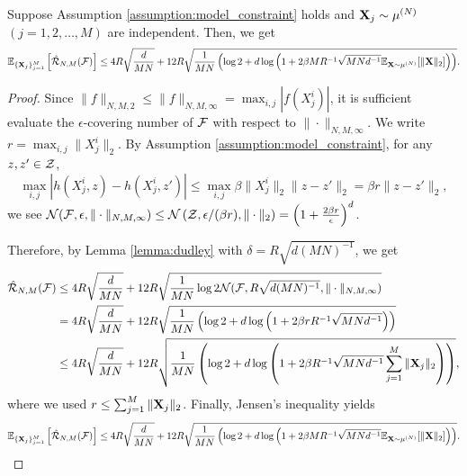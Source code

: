 \begin{proposition}\label{proposition:rademacher_complexity_bound}
    Suppose Assumption \ref{assumption:model_constraint} holds and $\vX_j \sim \pow[\mu,N]$ $(j=1,2,\ldots,M)$ are independent. Then, we get
    \[ \bE_{\{\vX_j\}_{j=1}^M} \left[\hat{\cR}_{N,M}(\cF) \right] 
    \leq 4 R\sqrt{\frac{d}{MN}}
        + 12R\sqrt{\frac{1}{MN} \left(\log 2 + d\log \left( 1 + 2\beta MR^{-1}\sqrt{MNd^{-1}}\bE_{\vX\sim\pow[\mu,N]}[\|\vX\|_2]\right)\right)}. \]
\end{proposition}
\begin{proof}
    Since $\| f \|_{N,M,2} \leq \| f \|_{N,M,\infty} = \max_{i,j}|f(X^i_j)|$, it is sufficient evaluate the $\epsilon$-covering number of $\mathcal{F}$ with respect to $\| \cdot \|_{N,M,\infty}$. 
    We write $r=\max_{i,j}\|X^i_j\|_2$. By Assumption \ref{assumption:model_constraint}, for any $z, z' \in \mathcal{Z}$,
    \[ \max_{i,j}| h(X^i_j,z) - h(X^i_j,z')| 
    \leq \max_{i,j} \beta \|X^i_j\|_2  \| z - z' \|_2 
    =  \beta r \| z - z' \|_2, \]
    we see $\mathcal{N}(\mathcal{F}, \epsilon,\|\cdot\|_{N,M,\infty}) \leq \mathcal{N}\left(\mathcal{Z}, \epsilon/(\beta r), \|\cdot\|_{2}\right) = \left( 1 + \frac{2 \beta r}{\epsilon}\right)^{d}$.

    Therefore, by Lemma \ref{lemma:dudley} with $\delta = R\sqrt{d(MN)^{-1}}$, we get
    \begin{align*}
        \hat{\mathcal{R}}_{N,M}(\mathcal{F}) 
        &\leq 4R \sqrt{\frac{d}{MN}}
        + 12R\sqrt{\frac{1}{MN}\log 2 \mathcal{N}(\mathcal{F},R\sqrt{d(MN)^{-1}},\|\cdot\|_{N,M,\infty})} \\
        &=4R \sqrt{\frac{d}{MN}}
        + 12R\sqrt{\frac{1}{MN} \left(\log 2 + d\log \left( 1 + 2 \beta r R^{-1}\sqrt{MNd^{-1}}\right)\right)} \\
        &\leq 4R \sqrt{\frac{d}{MN}}
        + 12R\sqrt{\frac{1}{MN} \left(\log 2 + d\log \left( 1 + 2 \beta R^{-1}\sqrt{MNd^{-1}} \sum_{j=1}^M \|\mathbf{X}_j\|_2\right)\right)},
    \end{align*}
    where we used $r \leq \sum_{j=1}^M \|\mathbf{X}_j\|_2$.
    Finally, Jensen's inequality yields
    \[ \bE_{\{\vX_j\}_{j=1}^M} \left[\hat{\cR}_{N,M}(\cF) \right] 
    \leq 4R \sqrt{\frac{d}{MN}}
        + 12R\sqrt{\frac{1}{MN} \left(\log 2 + d\log \left( 1 + 2\beta MR^{-1}\sqrt{MNd^{-1}}\bE_{\vX\sim\pow[\mu,N]}[\|\vX\|_2] \right)\right)}.\]
\end{proof}

